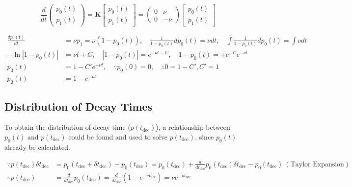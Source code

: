 \begin{equation}
    \frac{d}{dt}
\begin{pmatrix}
p_0(t) \\
p_1(t)
\end{pmatrix}
= \mathbf{K}
\begin{bmatrix}
p_0(t) \\
p_1(t)
\end{bmatrix}
= \begin{pmatrix}
    0 & \nu \\
    0 & -\nu
    \end{pmatrix}
    \begin{bmatrix}
        p_0(t) \\
        p_1(t)
        \end{bmatrix}  
\label{eq:Master_equation}
\end{equation}

\begin{align*}
    \frac{d p_0(t)}{dt} &= \nu p_1 = \nu (1 - p_0(t)), \quad
    \frac{1}{1 - p_0(t)} dp_0(t) = \nu dt , \quad
    \int \frac{1}{1 - p_0(t)} dp_0(t) = \int \nu dt \\
    -\ln |1 - p_0(t)| &= \nu t + C , \quad
    |1 - p_0(t)| = e^{-\nu t - C} ,\quad
    1 - p_0(t) = \pm e^{-C} e^{-\nu t} \\
    p_0(t) &= 1 - C' e^{-\nu t}, \quad
    \because p_0(0) = 0, \quad
    \therefore 0 = 1 - C', C' = 1\\
    p_0(t) &= 1 - e^{-\nu t}
\end{align*}

\subsection{Distribution of Decay Times}
To obtain the distribution of decay time ($p(t_{\text{dec}})$), 
a relationship between $p_0(t)$ and $p(t_{\text{dec}})$ 
could be found and used to solve $p(t_{\text{dec}})$, 
since $p_0(t)$ already be calculated.

\begin{align*}
    \because p(t_{\text{dec}}) \delta t_{\text{dec}} &= 
    p_0(t_{\text{dec}} + \delta t_{\text{dec}}) - p_0(t_{\text{dec}})
    = p_0(t_{\text{dec}}) + \frac{d}{d t_{\text{dec}}}p_0(t_{\text{dec}})\delta t_{\text{dec}} - p_0(t_{\text{dec}}) \: (\text{Taylor Expansion})\\
    \therefore p(t_{\text{dec}}) &= \frac{d}{d t_{\text{dec}}}p_0(t_{\text{dec}})
    = \frac{d}{d t_{\text{dec}}}(1 - e^{-\nu t_{\text{dec}}})
    = \nu e^{-\nu t_{\text{dec}}}
\end{align*}

